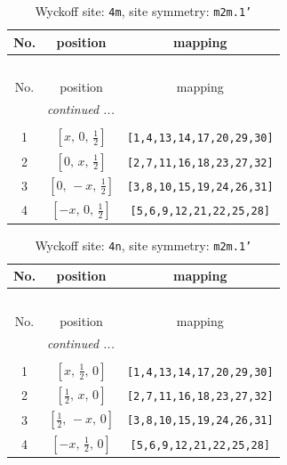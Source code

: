 \documentclass[fleqn,8pt]{jsarticle}
\begin{document}
\renewcommand{\arraystretch}{1.2}
\begin{longtable}{ccc}
\caption{Wyckoff site: {\tt 4m}, site symmetry: {\tt m2m.1'}}
 \\
 \hline \hline
No. & position & mapping \\ \hline \endfirsthead

\multicolumn{2}{l}{\tablename\ \thetable{}} \\
 \hline \hline
No. & position & mapping \\ \hline \endhead

 \hline \hline
\multicolumn{2}{r}{\footnotesize\it continued ...} \\ \endfoot

 \hline \hline
\multicolumn{2}{r}{} \\ \endlastfoot

1 & $\left[ x,\, 0,\, \frac{1}{2} \right]$ & {\tt [1,4,13,14,17,20,29,30]} \\ \hline
2 & $\left[ 0,\, x,\, \frac{1}{2} \right]$ & {\tt [2,7,11,16,18,23,27,32]} \\ \hline
3 & $\left[ 0,\, - x,\, \frac{1}{2} \right]$ & {\tt [3,8,10,15,19,24,26,31]} \\ \hline
4 & $\left[ - x,\, 0,\, \frac{1}{2} \right]$ & {\tt [5,6,9,12,21,22,25,28]} \\
\end{longtable}
\renewcommand{\arraystretch}{1.2}
\begin{longtable}{ccc}
\caption{Wyckoff site: {\tt 4n}, site symmetry: {\tt m2m.1'}}
 \\
 \hline \hline
No. & position & mapping \\ \hline \endfirsthead

\multicolumn{2}{l}{\tablename\ \thetable{}} \\
 \hline \hline
No. & position & mapping \\ \hline \endhead

 \hline \hline
\multicolumn{2}{r}{\footnotesize\it continued ...} \\ \endfoot

 \hline \hline
\multicolumn{2}{r}{} \\ \endlastfoot

1 & $\left[ x,\, \frac{1}{2},\, 0 \right]$ & {\tt [1,4,13,14,17,20,29,30]} \\ \hline
2 & $\left[ \frac{1}{2},\, x,\, 0 \right]$ & {\tt [2,7,11,16,18,23,27,32]} \\ \hline
3 & $\left[ \frac{1}{2},\, - x,\, 0 \right]$ & {\tt [3,8,10,15,19,24,26,31]} \\ \hline
4 & $\left[ - x,\, \frac{1}{2},\, 0 \right]$ & {\tt [5,6,9,12,21,22,25,28]} \\
\end{longtable}
\end{document}
